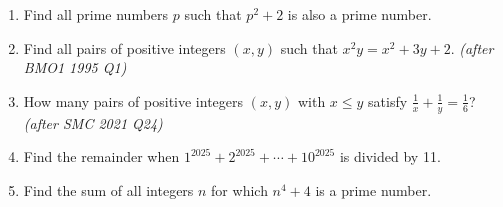 \documentclass[11pt,a4paper]{article}
\begin{document}
\begin{enumerate}

\item Find all prime numbers $p$ such that $p^2 + 2$ is also a prime number.

\item Find all pairs of positive integers $(x,y)$ such that $x^2 y = x^2 + 3y + 2$. \textit{\small(after BMO1 1995 Q1)}

\item How many pairs of positive integers $(x,y)$ with $x \le y$ satisfy $\frac{1}{x} + \frac{1}{y} = \frac{1}{6}$? \textit{\small(after SMC 2021 Q24)}

\item Find the remainder when $1^{2025} + 2^{2025} + \cdots + 10^{2025}$ is divided by 11.

\item Find the sum of all integers $n$ for which $n^4 + 4$ is a prime number.

\end{enumerate}

\end{document}
